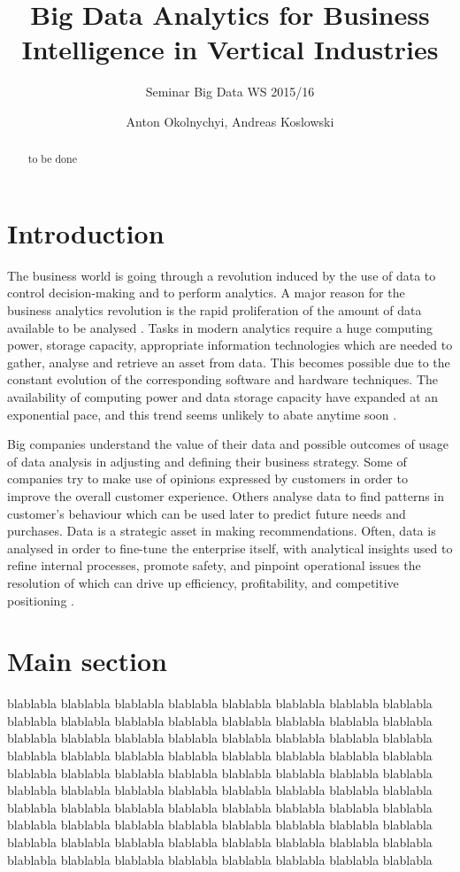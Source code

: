 \documentclass[runningheads]{llncs}
\title{Big Data Analytics for Business Intelligence in Vertical Industries}
\subtitle{Seminar Big Data WS 2015/16}
\author{Anton Okolnychyi, Andreas Koslowski}
\institute{RWTH Aachen University, 52056 Aachen, Germany\\
\{anton.okolnychyi, andreas.koslowski\}@rwth-aachen.de}
\begin{document}
\maketitle

\begin{abstract}
to be done
\end{abstract}

\section{Introduction}
The business world is going through a revolution induced by the use of data to control decision-making and to perform analytics. A major reason for the business analytics revolution is the rapid proliferation of the amount of data available to be analysed \cite{Gopalkrishnan}. Tasks in modern analytics require a huge computing power, storage capacity, appropriate information technologies which are needed to gather, analyse and retrieve an asset from data. This becomes possible due to the constant evolution of the corresponding software and hardware techniques. The availability of computing power and data storage capacity have expanded at an exponential pace, and this trend seems unlikely to abate anytime soon \cite{NYTIMES}.  

Big companies understand the value of their data and possible outcomes of usage of data analysis in adjusting and defining their business strategy.  Some of companies try to make use of opinions expressed by customers in order to improve the overall customer experience. Others analyse data to find patterns in customer's behaviour which can be used later to predict future needs and purchases. Data is a strategic asset in making recommendations. Often, data is analysed in order to fine-tune the enterprise itself, with analytical insights used to refine internal processes, promote safety, and pinpoint operational issues the resolution of which can drive up efficiency, profitability, and competitive positioning \cite{Guszcza}.

\section{Main section}

blablabla
blablabla
blablabla
blablabla
blablabla
blablabla
blablabla
blablabla
blablabla
blablabla
blablabla
blablabla
blablabla
blablabla
blablabla
blablabla
blablabla
blablabla
blablabla
blablabla
blablabla
blablabla
blablabla
blablabla
blablabla
blablabla
blablabla
blablabla
blablabla
blablabla
blablabla
blablabla
blablabla
blablabla
blablabla
blablabla
blablabla
blablabla
blablabla
blablabla
blablabla
blablabla
blablabla
blablabla
blablabla
blablabla
blablabla
blablabla
blablabla
blablabla
blablabla
blablabla
blablabla
blablabla
blablabla
blablabla
blablabla
blablabla
blablabla
blablabla
blablabla
blablabla
blablabla
blablabla
blablabla
blablabla
blablabla
blablabla
blablabla
blablabla
blablabla
blablabla
blablabla
blablabla
blablabla
blablabla
blablabla
blablabla
blablabla
blablabla
\end{document}
